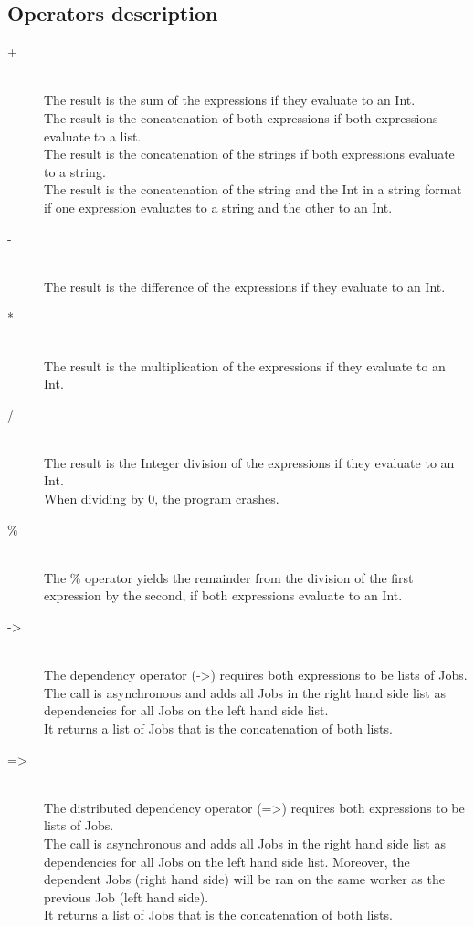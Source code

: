 \documentclass[12pt]{article}
\begin{document}
\subsection{Operators description}
\begin{description}
\item[+] \hfil \\
The result is the sum of the expressions if they evaluate to an Int.\\
The result is the concatenation of both expressions if both expressions evaluate to
a list.\\
The result is the concatenation of the strings if both expressions evaluate to
a string.\\
The result is the concatenation of the string and the Int in a string format if
one expression evaluates to a string and the other to an Int.\\

\item[-] \hfil \\
The result is the difference of the expressions if they evaluate to an Int.

\item[*] \hfil \\
The result is the multiplication of the expressions if they evaluate to an Int.

\item[/] \hfil \\
The result is the Integer division of the expressions if they evaluate to an Int.\\
When dividing by 0, the program crashes.

\item[\%] \hfil \\
The \% operator yields the remainder from the division of the first expression by the second, if
both expressions evaluate to an Int.

\item[->] \hfil \\
The dependency operator (->) requires both expressions to be lists of Jobs.\\
The call is asynchronous and adds all Jobs in the right hand side list as dependencies
for all Jobs on the left hand side list.\\
It returns a list of Jobs that is the concatenation of both lists.

\item[=>] \hfil \\
The distributed dependency operator (=>) requires both expressions to be lists of Jobs.\\
The call is asynchronous and adds all Jobs in the right hand side list as dependencies
for all Jobs on the left hand side list. Moreover, the dependent Jobs (right
hand side)  will be ran on the same worker as the previous Job (left hand
side).\\
It returns a list of Jobs that is the concatenation of both lists.


\end{description}
\end{document}
